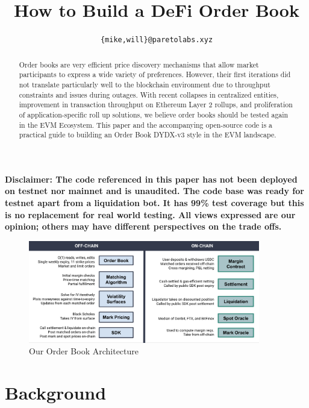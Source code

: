 \documentclass{article}
\title{How to Build a DeFi Order Book}
\author{\texttt{\{mike,will\}@paretolabs.xyz}}
\begin{document}
\maketitle

\begin{abstract}
\noindent Order books are very efficient price discovery mechanisms that allow market participants to express a wide variety of preferences. However, their first iterations did not translate particularly well to the blockchain environment due to throughput constraints and issues during outages. With recent collapses in centralized entities, improvement in transaction throughput on Ethereum Layer 2 rollups, and proliferation of application-specific roll up solutions, we believe order books should be tested again in the EVM Ecosystem. This paper and the accompanying open-source code is a practical guide to building an Order Book DYDX-v3 style in the EVM landscape.\newline 
\end{abstract}

\newline \noindent \textbf{Disclaimer: The code referenced in this paper has not been deployed on testnet nor mainnet and is unaudited. The code base was ready for testnet apart from a liquidation bot. It has 99\% test coverage but this is no replacement for real world testing. All views expressed are our opinion; others may have different perspectives on the trade offs.}

\begin{figure}[b!]
\centering
\label{fig:overview2}
\includegraphics[width=0.9\textwidth]{images/overview2.png}
\caption{Our Order Book Architecture}
\end{figure}

\section{Background}
\end{document}
